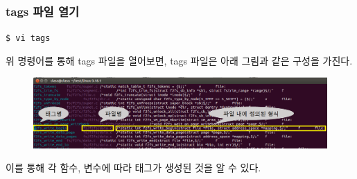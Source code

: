 \documentclass[newPxFont,sthlmFooter,nooffset]{beamer}
\begin{document}
\begin{frame}[containsverbatim,t]
  \frametitle{tags 파일 열기}
\begin{mdframed}[backgroundcolor=lightgray,hidealllines=true]
\texttt{\textcolor[rgb]{0,0,0}{\$ vi tags}}
\end{mdframed}
\bigskip
위 명령어를 통해 tags 파일을 열어보면, tags 파일은 아래 그림과 같은 구성을 가진다. 
\smallskip
\begin{figure}[h]
\includegraphics[width=0.98\linewidth]{./figure/tagsinside.png}
\end{figure}
이를 통해 각 함수, 변수에 따라 태그가 생성된 것을 알 수 있다.
\end{frame}
\end{document}
